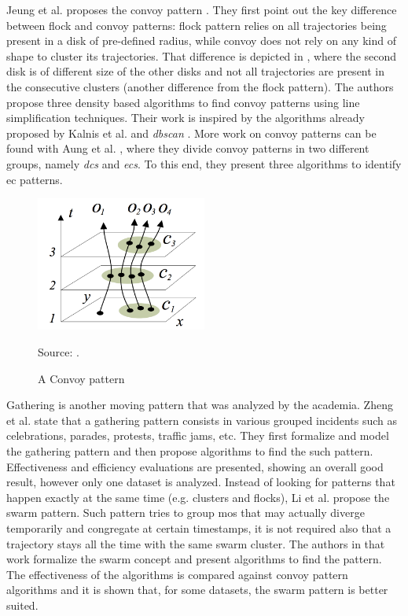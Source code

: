 Jeung et al. proposes the convoy pattern \citep{convoy2}\citep{convoy}. They first point out the key difference between
flock and convoy patterns: flock pattern relies on all trajectories being present in a disk of pre-defined radius, while
convoy does not rely on any kind of shape to cluster its trajectories. That difference is depicted in
, where the second disk is of different size of the other disks and not all trajectories are
present in the consecutive clusters (another difference from the flock pattern). The authors propose three density based
algorithms to find convoy patterns using line simplification techniques. Their work is inspired by the algorithms
already proposed by Kalnis et al. \citep{movingclusters} and \textit{\ac{dbscan}} \citep{dbscan}. More work on convoy
patterns can be found with Aung et al. \citep{convoy3}, where they divide convoy patterns in two different groups,
namely \textit{\acp{dc}} and \textit{\acp{ec}}. To this end, they present three algorithms to identify \ac{ec} patterns.

\begin{figure}
    \centering
    \caption{A Convoy pattern}
    \centerline{\includegraphics[width=0.5\textwidth]{images/convoy.png}}
    \footnotesize{Source: \citep{convoy2}.}
    \label{fig:convoy_pattern}
\end{figure}

Gathering is another moving pattern that was analyzed by the academia. Zheng et al. \citep{gathering} state that a
gathering pattern consists in various grouped incidents such as celebrations, parades, protests, traffic jams, etc. They
first formalize and model the gathering pattern and then propose algorithms to find the such pattern. Effectiveness and
efficiency evaluations are presented, showing an overall good result, however only one dataset is analyzed. Instead of
looking for patterns that happen exactly at the same time (e.g. clusters and flocks), Li et al. \citep{swarm} propose
the swarm pattern. Such pattern tries to group \acp{mo} that may actually diverge temporarily and congregate at certain
timestamps, it is not required also that a trajectory stays all the time with the same swarm cluster. The authors in
that work formalize the swarm concept and present algorithms to find the pattern. The effectiveness of the algorithms
is compared against convoy pattern algorithms and it is shown that, for some datasets, the swarm pattern is better
suited.

